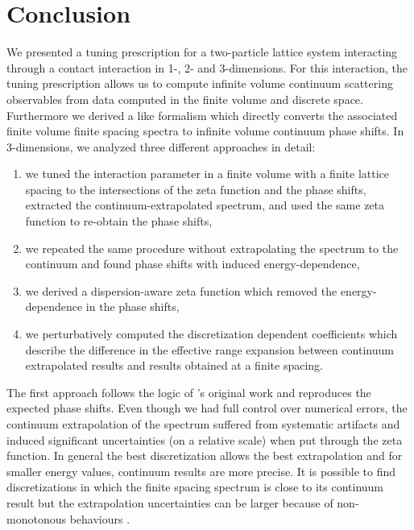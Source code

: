 \section{Conclusion}\label{sec:conclusion}

We presented a tuning prescription for a two-particle lattice system interacting through a contact interaction in 1-, 2- and 3-dimensions.
For this interaction, the tuning prescription allows us to compute infinite volume continuum scattering observables %
from data computed in the finite volume and discrete space.
Furthermore we derived a \Luscher like formalism which directly converts the associated finite volume finite spacing spectra to infinite volume continuum phase shifts.
In 3-dimensions, we analyzed three different approaches in detail:
\begin{enumerate}
	\item we tuned the interaction parameter in a finite volume with a finite lattice spacing to the intersections of the \Luscher zeta function and the phase shifts, extracted the continuum-extrapolated spectrum, and used the same \Luscher zeta function to re-obtain the phase shifts,
	\item we repeated the same procedure without extrapolating the spectrum to the continuum and found phase shifts with induced energy-dependence,
	\item we derived a dispersion-aware zeta function which removed the energy-dependence in the phase shifts,
	\item we perturbatively computed the discretization dependent coefficients which describe the difference in the effective range expansion between continuum extrapolated results and results obtained at a finite spacing.
\end{enumerate}

The first approach follows the logic of \Luscher's original work and reproduces the expected phase shifts.
Even though we had full control over numerical errors, the continuum extrapolation of the spectrum suffered from systematic artifacts and induced significant uncertainties (on a relative scale) when put through the zeta function.
In general the best discretization allows the best extrapolation and for smaller energy values, continuum results are more precise.
It is possible to find discretizations in which the finite spacing spectrum is close to its continuum result but the extrapolation uncertainties can be larger because of non-monotonous behaviours .

